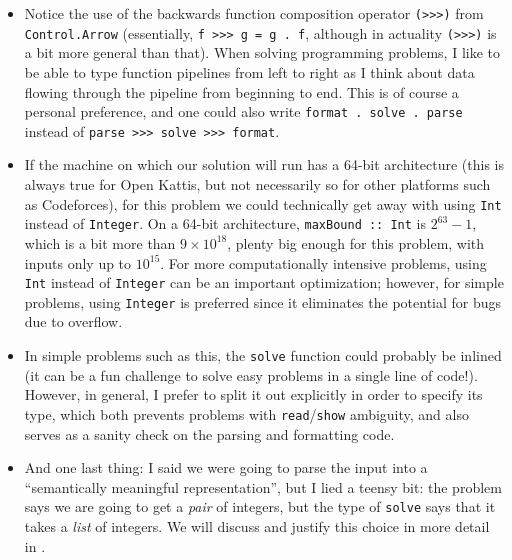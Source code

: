 \documentclass{book}
\newcommand{\pref}[1]{\prettyref{#1}}
\newcommand{\h}[1]{\texttt{#1}}
\begin{document}
\begin{itemize}
\item Notice the use of the backwards function composition operator
  \h{(>>>)} from \h{Control.Arrow} (essentially, \h{f >>> g = g . f},
  although in actuality \h{(>>>)} is a bit more general than that).
  When solving programming problems, I like to be able to type
  function pipelines from left to right as I think about data flowing
  through the pipeline from beginning to end.  This is of course a
  personal preference, and one could also write %
  \h{format . solve . parse} instead of %
  \h{parse >>> solve >>> format}.
\item If the machine on which our solution will run has a 64-bit
  architecture (this is always true for Open Kattis, but not
  necessarily so for other platforms such as Codeforces), for this
  problem we could technically get away with using \h{Int} instead of
  \h{Integer}. On a 64-bit architecture, \h{maxBound :: Int} is $2^{63} -
  1$, which is a bit more than $9 \times
  10^{18}$, plenty big enough for this problem, with inputs only up to
  $10^{15}$. For more computationally intensive problems, using \h{Int}
  instead of \h{Integer} can be an important optimization; however, for
  simple problems, using \h{Integer} is preferred since it eliminates
  the potential for bugs due to overflow.

\item In simple problems such as this, the \h{solve} function could
  probably be inlined (it can be a fun challenge to solve easy
  problems in a single line of code!).  However, in general, I prefer
  to split it out explicitly in order to specify its type, which both
  prevents problems with \h{read}/\h{show} ambiguity, and also serves as a
  sanity check on the parsing and formatting code.

\item And one last thing: I said we were going to parse the input into
  a ``semantically meaningful representation'', but I lied a teensy
  bit: the problem says we are going to get a \emph{pair} of integers,
  but the type of \h{solve} says that it takes a \emph{list} of
  integers.  We will discuss and justify this choice in more detail in
  \pref{sec:partial}.
\end{itemize}

\end{document}
